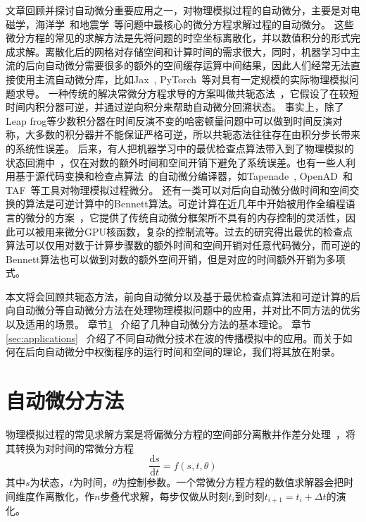 \documentclass[A4,twoside,UTF8]{ctexart}
\def\D{\mathrm{d}}
\begin{document}
文章回顾并探讨自动微分重要应用之一，对物理模拟过程的自动微分，主要是对电磁学，海洋学~\cite{Heimbach2005}和地震学~\cite{Symes2007,Zhu2020}等问题中最核心的微分方程求解过程的自动微分。
这些微分方程的常见的求解方法是先将问题的时空坐标离散化，并以数值积分的形式完成求解。离散化后的网格对存储空间和计算时间的需求很大，同时，机器学习中主流的后向自动微分需要很多的额外的空间缓存运算中间结果，因此人们经常无法直接使用主流自动微分库，比如Jax~\cite{James2018}, PyTorch~\cite{Paszke2019}等对具有一定规模的实际物理模拟问题求导。
一种传统的解决常微分方程求导的方案叫做共轭态法~\cite{Plessix2006,Chen2018}，它假设了在较短时间内积分器可逆，并通过逆向积分来帮助自动微分回溯状态。
事实上，除了Leap frog等少数积分器在时间反演不变的哈密顿量问题中可以做到时间反演对称，大多数的积分器并不能保证严格可逆，所以共轭态法往往存在由积分步长带来的系统性误差。
后来，有人把机器学习中的最优检查点算法带入到了物理模拟的状态回溯中~\cite{Symes2007}，仅在对数的额外时间和空间开销下避免了系统误差。也有一些人利用基于源代码变换和检查点算法~\cite{Griewank1992,Forget2015}的自动微分编译器，如Tapenade~\cite{Hascoet2013}, OpenAD~\cite{Utke2008}和TAF~\cite{Heimbach2005}等工具对物理模拟过程微分。
还有一类可以对后向自动微分做时间和空间交换的算法是可逆计算中的Bennett算法。可逆计算在近几年中开始被用作全编程语言的微分的方案~\cite{Liu2020b}，它提供了传统自动微分框架所不具有的内存控制的灵活性，因此可以被用来微分GPU核函数，复杂的控制流等。过去的研究得出最优的检查点算法可以仅用对数于计算步骤数的额外时间和空间开销对任意代码微分，而可逆的Bennett算法也可以做到对数的额外空间开销，但是对应的时间额外开销为多项式。

   本文将会回顾共轭态方法，前向自动微分以及基于最优检查点算法和可逆计算的后向自动微分等自动微分方法在处理物理模拟问题中的应用，并对比不同方法的优劣以及适用的场景。
章节\ref{sec:forwardbackward}~ 介绍了几种自动微分方法的基本理论。
章节\ref{sec:applications}~ 介绍了不同自动微分技术在波的传播模拟中的应用。而关于如何在后向自动微分中权衡程序的运行时间和空间的理论，我们将其放在附录。

\section{自动微分方法}\label{sec:forwardbackward}

    物理模拟过程的常见求解方案是将偏微分方程的空间部分离散并作差分处理~\cite{Grote2010}，将其转换为对时间的常微分方程
    $$\frac{\D s}{\D t} = f(s, t, \theta)$$
其中$s$为状态，$t$为时间，$\theta$为控制参数。一个常微分方程方程的数值求解器会把时间维度作离散化，作$n$步叠代求解，每步仅做从时刻$t_i$到时刻$t_{i+1} = t_{i}+\Delta t$的演化。
\end{document}
